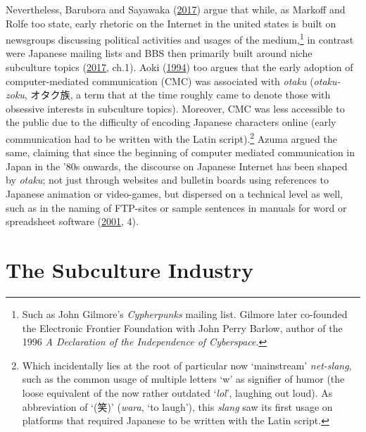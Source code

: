 \documentclass[10pt,british,A4paper,twoside]{memoir}
\begin{document}
Nevertheless, Barubora and Sayawaka
(\protect\hyperlink{ref-barubora_eng:_2017}{2017}) argue that while, as
Markoff and Rolfe too state, early rhetoric on the Internet in the united states
is built on newsgroups discussing political activities and usages of the
medium,\footnote{Such as John Gilmore's \emph{Cypherpunks} mailing list.
  Gilmore later co-founded the Electronic Frontier Foundation with John
  Perry Barlow, author of the 1996 \emph{A Declaration of the
  Independence of Cyberspace}.} in contrast were Japanese mailing lists
and BBS then primarily built around niche subculture topics
(\protect\hyperlink{ref-barubora_eng:_2017}{2017}, ch.1). Aoki
(\protect\hyperlink{ref-aoki_virtual_1994}{1994}) too argues that the
early adoption of computer-mediated communication (CMC) was associated with
\emph{otaku} (\emph{otaku-zoku}, オタク族, a term that at the time
roughly came to denote those with obsessive interests in subculture
topics). Moreover, CMC was less accessible to the public due to the
difficulty of encoding Japanese characters online (early communication
had to be written with the Latin script).\footnote{Which incidentally
  lies at the root of particular now `mainstream' \emph{net-slang}, such
  as the common usage of multiple letters `w' as signifier of humor (the
  loose equivalent of the now rather outdated `\emph{lol}', laughing out
  loud). As abbreviation of `(笑)' (\emph{wara}, `to laugh'), this
  \emph{slang} saw its first usage on platforms that required Japanese
  to be written with the Latin script.} Azuma argued the same, claiming
that since the beginning of computer mediated communication in Japan in
the '80s onwards, the discourse on Japanese Internet has been shaped by
\emph{otaku}; not just through websites and bulletin boards using
references to Japanese animation or video-games, but dispersed on a
technical level as well, such as in the naming of FTP-sites or sample
sentences in manuals for word or spreadsheet software
(\protect\hyperlink{ref-azuma_otaku:_2001}{2001}, 4).

\section{The Subculture Industry}\label{the-subculture-industry}
\end{document}
